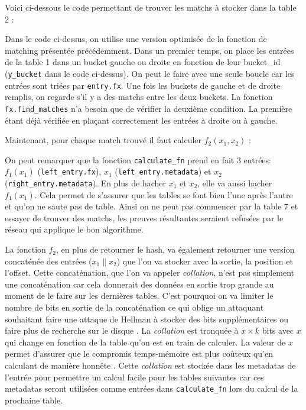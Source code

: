 Voici ci-dessous le code permettant de trouver les matchs à stocker dans la table 2 :


Dans le code ci-dessus, on utilise une version optimisée de la fonction de matching présentée précédemment. Dans un premier temps, on place les entrées de la table 1 dans un bucket gauche ou droite en fonction de leur bucket\_id (\verb|y_bucket| dans le code ci-dessus). On peut le faire avec une seule boucle car les entrées sont triées par \verb|entry.fx|. Une fois les buckets de gauche et de droite remplis, on regarde s'il y a des matchs entre les deux buckets. La fonction \verb|fx.find_matches| n'a besoin que de vérifier la deuxième condition. La première étant déjà vérifiée en plaçant correctement les entrées à droite ou à gauche.

Maintenant, pour chaque match trouvé il faut calculer $f_2(x_1,x_2)$ :


On peut remarquer que la fonction \verb|calculate_fn| prend en fait 3 entrées: $f_1(x_1)$ (\verb|left_entry.fx|), $x_1$ (\verb|left_entry.metadata|) et $x_2$ (\verb|right_entry.metadata|). En plus de hacher $x_1$ et $x_2$, elle va aussi hacher $f_1(x_1)$. Cela permet de s'assurer que les tables se font bien l'une après l'autre et qu'on ne saute pas de table. Ainsi on ne peut pas commencer par la table 7 et essayer de trouver des matchs, les preuves résultantes seraient refusées par le réseau qui applique le bon algorithme.

La fonction $f_2$, en plus de retourner le hash, va également retourner une version concaténée des entrées ($x_1\|x_2$) que l'on va stocker avec la sortie, la position et l'offset. Cette concaténation, que l'on va appeler \emph{collation}, n'est pas simplement une concaténation car cela donnerait des données en sortie trop grande au moment de le faire sur les dernières tables. C'est pourquoi on va limiter le nombre de bits en sortie de la concaténation ce qui oblige un attaquant souhaitant faire une attaque de Hellman à stocker des bits supplémentaires ou faire plus de recherche sur le disque \cite{chia:construction}. La \emph{collation} est tronquée à $x \times k$ bits avec $x$ qui change en fonction de la table qu'on est en train de calculer. La valeur de $x$ permet d'assurer que le compromis temps-mémoire est plus coûteux qu'en calculant de manière honnête \cite{chia:construction}. Cette \emph{collation} est stockée dans les metadatas de l'entrée pour permettre un calcul facile pour les tables suivantes car ces metadatas seront utilisées comme entrées dans \verb|calculate_fn| lors du calcul de la prochaine table.

